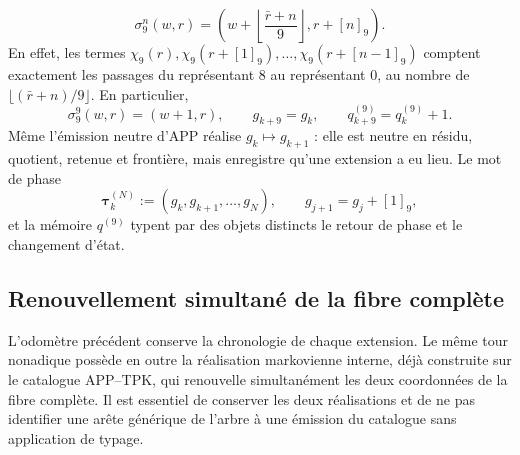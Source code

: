 \begin{equation}
\label{eq:continuo-comun-iteracion-fase-tpk}
 \sigma_9^n(w,r)=
 \left(w+\left\lfloor\frac{\bar r+n}{9}\right\rfloor,
       r+[n]_9\right).
\end{equation}
En effet, les termes \(\chi_9(r),\chi_9(r+[1]_9),\ldots,\chi_9(r+[n-1]_9)\) comptent exactement les passages du représentant \(8\) au représentant \(0\), au nombre de \(\lfloor(\bar r+n)/9\rfloor\). En particulier,
\begin{equation}
\label{eq:continuo-comun-retorno-fase-avance-memoria}
 \sigma_9^9(w,r)=(w+1,r),\qquad
 g_{k+9}=g_k,\qquad q^{(9)}_{k+9}=q^{(9)}_k+1.
\end{equation}
Même l'émission neutre d'APP réalise \(g_k\mapsto g_{k+1}\) : elle est neutre en résidu, quotient, retenue et frontière, mais enregistre qu'une extension a eu lieu. Le mot de phase
\begin{equation}
\label{eq:continuo-comun-palabra-fase-tpk}
 \boldsymbol\tau_k^{(N)}:=(g_k,g_{k+1},\ldots,g_N),
 \qquad g_{j+1}=g_j+[1]_9,
\end{equation}
et la mémoire \(q^{(9)}\) typent par des objets distincts le retour de phase et le changement d'état.

\subsection{Renouvellement simultané de la fibre complète}
\label{sec:continuo-comun-kph}

L'odomètre précédent conserve la chronologie de chaque extension. Le même tour nonadique possède en outre la réalisation markovienne interne, déjà construite sur le catalogue APP--TPK, qui renouvelle simultanément les deux coordonnées de la fibre complète. Il est essentiel de conserver les deux réalisations et de ne pas identifier une arête générique de l'arbre à une émission du catalogue sans application de typage.

